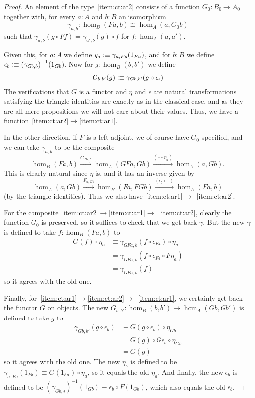\documentclass[10pt,a4paper]{article}
\newcommand{\jdeq}{\equiv}      %
\newcommand{\defeq}{\vcentcolon\equiv}  %
\newcommand{\blank}{\mathord{\hspace{1pt}\text{--}\hspace{1pt}}}
\newcommand{\inv}[1]{{#1}^{-1}}
\theoremstyle{definition}
\theoremstyle{remark}
\numberwithin{equation}{section}
\begin{document}
\begin{proof}
  An element of the type~\ref{item:ct:ar2} consists of a function $G_0:B_0 \to A_0$ together with, for every $a:A$ and $b:B$ an isomorphism
  \[ \gamma_{a,b}:\hom_B(Fa,b) \cong \hom_A(a,G_0 b) \]
  such that $\gamma_{a,b}(g \circ Ff) = \gamma_{a',b}(g)\circ f$ for $f:\hom_{A}(a,a')$.

  Given this, for $a:A$ we define $\eta_a \defeq \gamma_{a,Fa}(1_{Fa})$, and for $b:B$ we define $\epsilon_b \defeq \inv{(\gamma_{Gb,b})}(1_{Gb})$.
  Now for $g:\hom_B(b,b')$ we define
  \[ G_{b,b'}(g) \defeq \gamma_{G b, b'}(g \circ \epsilon_b) \]
  The verifications that $G$ is a functor and $\eta$ and $\epsilon$ are natural transformations satisfying the triangle identities are exactly as in the classical case, and as they are all mere propositions we will not care about their values.
  Thus, we have a function~\ref{item:ct:ar2}$\to$\ref{item:ct:ar1}.

  In the other direction, if $F$ is a left adjoint, we of course have $G_0$ specified, and we can take $\gamma_{a,b}$ to be the composite
  \[ \hom_B(Fa,b)
  \xrightarrow{G_{Fa,b}} \hom_A(GFa,Gb)
  \xrightarrow{(\blank\circ \eta_a)} \hom_A(a,Gb).
  \]
  This is clearly natural since $\eta$ is, and it has an inverse given by
  \[ \hom_A(a,Gb)
  \xrightarrow{F_{a,Gb}} \hom_B(Fa,FGb)
  \xrightarrow{(\epsilon_b \circ \blank )} \hom_A(Fa,b)
  \]
  (by the triangle identities).
  Thus we also have~\ref{item:ct:ar1}$\to$~\ref{item:ct:ar2}.

  For the composite~\ref{item:ct:ar2}$\to$\ref{item:ct:ar1}$\to$~\ref{item:ct:ar2}, clearly the function $G_0$ is preserved, so it suffices to check that we get back $\gamma$.
  But the new $\gamma$ is defined to take $f:\hom_B(Fa,b)$ to
  \begin{align*}
    G(f) \circ \eta_a
    &\jdeq \gamma_{G Fa, b}(f \circ \epsilon_{Fa}) \circ \eta_a\\
    &= \gamma_{G Fa, b}(f \circ \epsilon_{Fa} \circ F\eta_a)\\
    &= \gamma_{G Fa, b}(f)
  \end{align*}
  so it agrees with the old one.

  Finally, for~\ref{item:ct:ar1}$\to$\ref{item:ct:ar2}$\to$~\ref{item:ct:ar1}, we certainly get back the functor $G$ on objects.
  The new $G_{b,b'}:\hom_B(b,b') \to \hom_A(Gb,Gb')$ is defined to take $g$ to
  \begin{align*}
    \gamma_{G b, b'}(g \circ \epsilon_b)
    &\jdeq G(g \circ \epsilon_b) \circ \eta_{Gb}\\
    &= G(g) \circ G\epsilon_b \circ \eta_{Gb}\\
    &= G(g)
  \end{align*}
  so it agrees with the old one.
  The new $\eta_a$ is defined to be $\gamma_{a,Fa}(1_{Fa}) \jdeq G(1_{Fa}) \circ \eta_a$, so it equals the old $\eta_a$.
  And finally, the new $\epsilon_b$ is defined to be $\inv{(\gamma_{Gb,b})}(1_{Gb}) \jdeq \epsilon_b \circ F(1_{Gb})$, which also equals the old $\epsilon_b$.
\end{proof}
\end{document}
